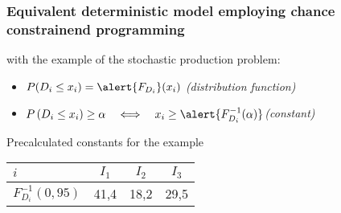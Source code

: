 \begin{frame}
 \frametitle{Equivalent deterministic model employing chance constrainend programming}
 with the example of the stochastic production problem:
 \begin{itemize}
  \item $P(D_i\leq x_i) = \alert{F_{D_i}}(x_i)$ \quad\alert{\textsl{(distribution function)}}\medskip
  \item $P\left(D_i\leq x_i\right) \geq \alpha \quad\Longleftrightarrow\quad x_i \geq \alert{F^{-1}_{D_i}(\alpha)}$\quad \alert{\textsl{(constant)}}
 \end{itemize}
 
 \begin{block}{Precalculated constants for the example}
  \begin{center}
  \begin{tabular}{lccc}
    \toprule
    $i$ & $I_1$ & $I_2$ & $I_3$\\
    \midrule
    $F^{-1}_{D_i}(0,95)$ & 41,4 & 18,2 & 29,5\\
    \bottomrule
  \end{tabular}
  \end{center}
 \end{block}
\end{frame}

